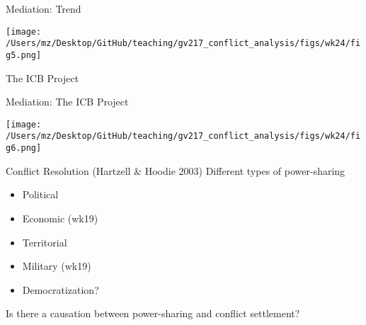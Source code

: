 \documentclass{beamer}
\begin{document}
\begin{frame}{Mediation: Trend}
    \pause
    \begin{center}
        \texttt{[image: /Users/mz/Desktop/GitHub/teaching/gv217\_conflict\_analysis/figs/wk24/fig5.png]}
    \end{center}
    \tiny The ICB Project
\end{frame}

\begin{frame}{Mediation: The ICB Project}
    \pause
    \begin{center}
        \texttt{[image: /Users/mz/Desktop/GitHub/teaching/gv217\_conflict\_analysis/figs/wk24/fig6.png]}
    \end{center}
\end{frame}

\begin{frame}{Conflict Resolution (Hartzell \& Hoodie 2003)}
    Different types of power-sharing
    \begin{itemize}
        \pause\item Political
        \pause\item Economic (wk19)
        \pause\item Territorial
        \pause\item Military (wk19)
        \pause\item Democratization?
    \end{itemize}
    Is there a causation between power-sharing and conflict settlement?
\end{frame}
\end{document}
